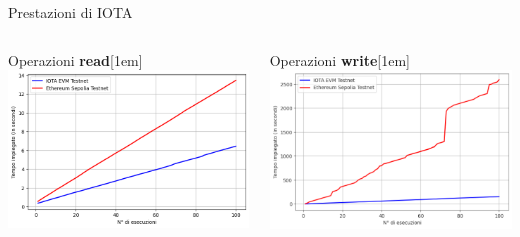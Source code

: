 \documentclass[xcolor=dvipsnames]{beamer}
\def\\{}%
\begin{document}
\begin{frame}{Prestazioni di IOTA}
    \begin{columns}
        \begin{column}{0.5\textwidth}
            \centering
            \large
            Operazioni \textbf{read}\\[1em]
            \includegraphics[width=\textwidth]{figures/my_is_lottery_open_runtime.png}
        \end{column}
        \begin{column}{0.5\textwidth}
            \centering
            \large 
            Operazioni \textbf{write}\\[1em]
            \includegraphics[width=\textwidth]{figures/my_buy_ticket_runtime.png}
        \end{column}
    \end{columns}
\end{frame}
\end{document}
